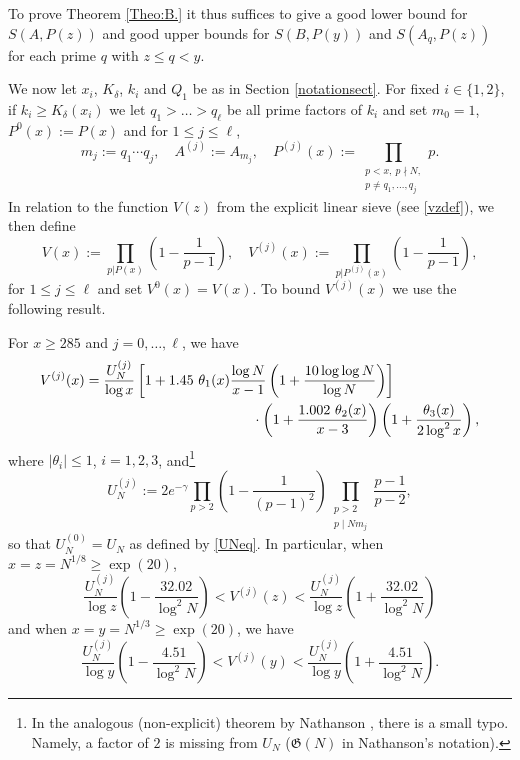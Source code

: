 \documentclass[12pt]{amsart}
\begin{document}
To prove Theorem \ref{Theo:B.} it thus suffices to give a good lower bound for $S(A,P(z))$ and good upper bounds for $S(B,P(y))$ and $S(A_q,P(z))$ for each prime $q$ with $z \le q <y$.\par
We now let $x_i$, $K_{\delta}$, $k_i$ and $Q_1$ be as in Section \ref{notationsect}.
For fixed $i\in\{1,2\}$, if $k_i\ge K_{\delta}(x_i)$ we let $q_1> \ldots> q_\ell$ be all prime factors of $k_i$ and set $m_0 = 1$, $P^0(x) := P(x)$ and for $1 \le j \le \ell$,
\begin{equation} \label{eq: def-mj-Aj-Pj(x)}
    m_j:=q_1\cdots q_j,\quad A^{(j)}:=A_{m_j},\quad 
    P^{(j)}(x):=\prod_{\substack{p<x,~ p\nmid N,\\  p\neq q_1, \ldots, q_j}}p.
\end{equation}
In relation to the function $V(z)$ from the explicit linear sieve (see \eqref{vzdef}), we then define 
\begin{equation} \label{eq: def-V(x)-Vj(x)}
V(x):=\prod_{p|P(x)} \left(1-\frac{1}{p-1}\right),\quad
V^{(j)}(x):=\prod_{p|P^{(j)}(x)} \left(1-\frac{1}{p-1}\right),
\end{equation}
for $1 \le j \le \ell$ and set $V^0(x) = V(x)$. To bound $V^{(j)}(x)$ we use the following result.
\begin{lemma}\label{vjlem}
    For $x\ge 285$ and $j=0,\ldots,\ell$, we have
    \begin{align} \label{eq: Vj-UNj}
        V^{(j)}(x) &= \frac{U_N^{(j)}}{\log x} \left[ 1 + 1.45~\theta_1(x) \frac{\log N}{x-1} \left( 1 + \frac{10 \log \log N}{\log N} \right) \right]\notag\\
        &\qquad\qquad\qquad\qquad\qquad\qquad\cdot\left( 1 + \frac{1.002~\theta_2(x)}{x-3} \right) \left( 1 + \frac{\theta_3(x)}{2 \log^2 x} \right),
    \end{align}
    where $|\theta_i|\le 1$, $i = 1, 2, 3$, and\footnote{In the analogous (non-explicit) theorem by Nathanson \cite[Theorem 10.3]{Nathanson}, there is a small typo. Namely, a factor of $2$ is missing from $U_N$ ($\mathfrak{G}(N)$ in Nathanson's notation).  }
    \begin{equation} \label{eq: def-UNj}
        U^{(j)}_N:=2e^{-\gamma}\prod_{p>2} \left(1-\frac{1}{(p-1)^2} \right) \prod_{\substack{p>2\\ p\mid Nm_j}}\frac{p-1}{p-2},
    \end{equation}
    so that $U^{(0)}_N=U_N$ as defined by \eqref{UNeq}. In particular, when $x=z=N^{1/8}\ge\exp(20)$,
    \begin{equation}\label{vjzbound}
        \frac{U_N^{(j)}}{\log z}\left(1-\frac{32.02}{\log^2 N}\right)<V^{(j)}(z)<\frac{U_N^{(j)}}{\log z}\left(1+\frac{32.02}{\log^2 N}\right)
    \end{equation}
    and when $x=y=N^{1/3}\ge\exp(20)$, we have
    \begin{equation}\label{vjybound}
        \frac{U_N^{(j)}}{\log y}\left(1-\frac{4.51}{\log^2 N}\right)<V^{(j)}(y)<\frac{U_N^{(j)}}{\log y}\left(1+\frac{4.51}{\log^2 N}\right).
    \end{equation}
\end{lemma}
\end{document}
